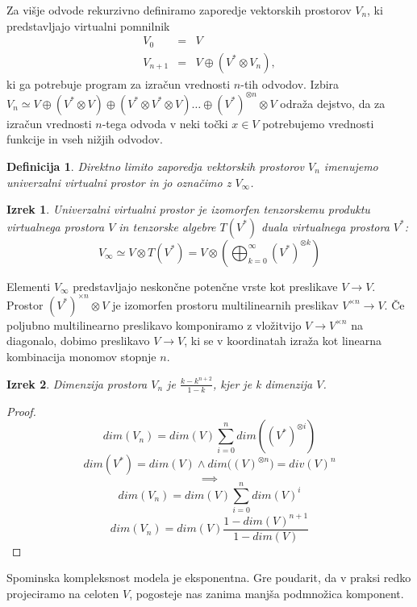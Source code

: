 \documentclass{article}
\newtheorem{definicija}{Definicija}[section]
\newtheorem{izrek}{Izrek}[section]
\begin{document}
Za višje odvode rekurzivno definiramo zaporedje vektorskih prostorov $V_n$, ki
predstavljajo virtualni pomnilnik
\begin{eqnarray}\label{eq:V_n}
  \label{eq:prapor}
  V_0 &=& V\\
  V_{n+1}&=&V\oplus (V^*\otimes V_n),
\end{eqnarray} 
ki ga potrebuje program za izračun vrednosti $n$-tih odvodov. Izbira $V_n\simeq
V\oplus (V^*\otimes V) \oplus (V^*\otimes V^*\otimes V) \ldots \oplus
(V^*)^{\otimes n}\otimes V$ odraža dejstvo, da za izračun vrednosti $n$-tega odvoda v neki točki $x\in V$
potrebujemo vrednosti funkcije in vseh nižjih odvodov.
\begin{definicija}
  Direktno limito zaporedja vektorskih prostorov $V_n$ imenujemo
  \emph{univerzalni virtualni prostor} in jo označimo z $V_\infty$.
\end{definicija}
\begin{izrek}
  Univerzalni virtualni prostor je izomorfen tenzorskemu produktu virtualnega
  prostora $V$ in tenzorske algebre $T(V^*)$ duala virtualnega prostora $V^*$:
  \begin{equation}
\label{eq:tenzor_algebra}
    V_\infty\simeq V\otimes T(V^*) = V \otimes\left(\bigoplus_{k=0}^\infty (V^*)^{\otimes k} \right)
\end{equation}

\end{izrek}



Elementi $V_\infty$ predstavljajo neskončne potenčne vrste kot preslikave 
$V\to V$. Prostor $(V^*)^{\times n}\otimes V$ je izomorfen prostoru
multilinearnih preslikav $V^{\times n}\to V$. Če poljubno
multilinearno preslikavo komponiramo z vložitvijo $V\to V^{\times n}$ na
diagonalo, dobimo preslikavo $V\to V$, ki se v koordinatah izraža kot linearna
kombinacija monomov stopnje $n$.

\begin{izrek}
 Dimenzija prostora $V_n$ je $\frac{k-k^{n+2}}{1-k}$, kjer je k dimenzija $V$.
 \end{izrek}

\begin{proof}
	$$dim(V_n)=dim(V)\sum\limits_{i=0}^{n}dim((V^*)^{\otimes i})$$
	$$dim(V^*)=dim(V)\land dim\Big((V)^{\otimes n}\Big)=div(V)^n$$
	$$\implies$$
	$$dim(V_n)=dim(V)\sum\limits_{i=0}^{n}dim(V)^{i}$$
	$$dim(V_n)=dim(V)\frac{1-dim(V)^{n+1}}{1-dim(V)}$$
\end{proof}

Spominska kompleksnost modela je eksponentna. Gre poudarit, da v praksi redko projeciramo na celoten $V$, pogosteje nas zanima manjša podmnožica komponent.
\end{document}
